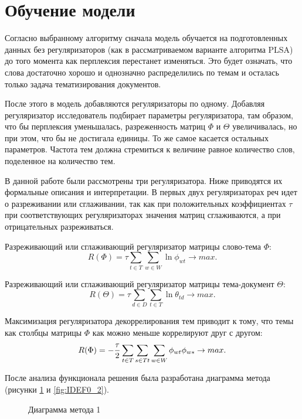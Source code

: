%
\section{Обучение модели}

Согласно выбранному алгоритму сначала модель обучается на подготовленных данных без регуляризаторов (как в рассматриваемом варианте алгоритма PLSA) до того момента как перплексия перестанет изменяться. Это будет означать, что слова достаточно хорошо и однозначно распределились по темам и осталась только задача тематизирования документов.

После этого в модель добавляются регуляризаторы по одному. Добавляя регуляризатор исследователь подбирает параметры регуляризатора, там образом, что бы перплексия уменьшалась, разреженность матриц $\Phi$ и $\Theta$ увеличивалась, но при этом, что бы не достигала единицы. То же самое касается остальных параметров. Частота тем должна стремиться к величине равное количество слов, поделенное на количество тем.

В данной работе были рассмотрены три регуляризатора. Ниже приводятся их формальные описания и интерпретации. В первых двух регуляризаторах реч идет о разреживании или сглаживании, так как при положительных коэффициентах $\tau$ при соответствующих регуляризаторах значения матриц сглаживаются, а при отрицательных разреживаться.

Разреживающий или сглаживающий регуляризатор матрицы слово-тема $\Phi$:
$$
R(\Phi) = \tau \sum_{t \in T}{ \sum_{w \in W} \ln{ \phi_{wt} }} \rightarrow max.
$$

Разреживающий или сглаживающий регуляризатор матрицы тема-документ $\Theta$:
$$
R(\Theta) = \tau \sum_{d \in D}{ \sum_{t \in T} \ln{ \theta_{td} }} \rightarrow max.
$$

Максимизация регуляризатора декоррелирования тем приводит к тому, что темы как столбцы матрицы $\Phi$ как можно меньше коррелируют друг с другом:
$$
R(\Phi) = -{{\tau}\over{2}} \sum_{t \in T}{ 
    \sum_{s \in T\\t}{
        \sum_{w \in W}{
            \phi_{wt} \phi_{ws}
        }
    }
} \rightarrow max.
$$

После анализа функционала решения была разработана диаграмма метода (рисунки \ref{fig:IDEF0_1} и \ref{fig:IDEF0_2}).

\begin{figure}[h]
    \caption{Диаграмма метода 1}
    \label{fig:IDEF0_1}
\end{figure}

